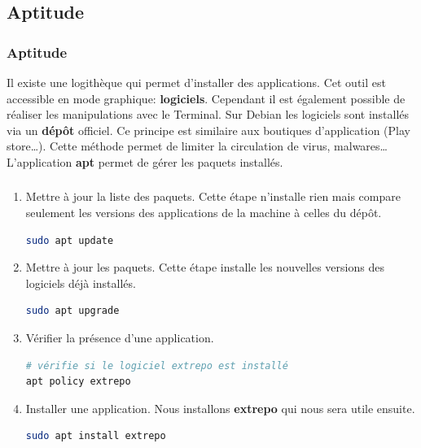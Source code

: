 \documentclass[svgnames,11pt]{beamer}
\begin{document}
\subsection{Aptitude}
\begin{frame}
    \frametitle{Aptitude}

    Il existe une logithèque qui permet d'installer des applications. Cet outil est accessible en mode graphique: \textbf{logiciels}. Cependant il est également possible de réaliser les manipulations avec le Terminal. Sur Debian les logiciels sont installés via un \textbf{dépôt} officiel. Ce principe est similaire aux boutiques d'application (Play store\dots). Cette méthode permet de limiter la circulation de virus, malwares\dots L'application \textbf{apt} permet de gérer les paquets installés.

\end{frame}
\begin{frame}[fragile]
    \frametitle{}
\begin{activite}
\begin{enumerate}
\item Mettre à jour la liste des paquets. Cette étape n'installe rien mais compare seulement les versions des applications de la machine à celles du dépôt.
\begin{lstlisting}[language=bash, basicstyle=\ttfamily\small, xleftmargin=2em, xrightmargin=2em]
sudo apt update
\end{lstlisting}
\item Mettre à jour les paquets. Cette étape installe les nouvelles versions des logiciels déjà installés.
\begin{lstlisting}[language=bash, basicstyle=\ttfamily\small, xleftmargin=2em, xrightmargin=2em]
sudo apt upgrade
\end{lstlisting}
\item Vérifier la présence d'une application.
\begin{lstlisting}[language=bash, basicstyle=\ttfamily\small, xleftmargin=2em, xrightmargin=2em]
# vérifie si le logiciel extrepo est installé
apt policy extrepo
\end{lstlisting}
\item Installer une application. Nous installons \textbf{extrepo} qui nous sera utile ensuite.
\begin{lstlisting}[language=bash, basicstyle=\ttfamily\small, xleftmargin=2em, xrightmargin=2em]
sudo apt install extrepo
\end{lstlisting}
\end{enumerate}
\end{activite}

\end{frame}
\end{document}
